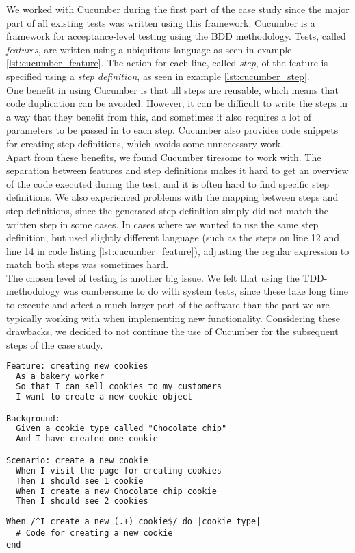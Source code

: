 
We worked with Cucumber during the first part of the case study since
the major part of all existing tests was written using this framework.
Cucumber is a framework for acceptance-level testing using the BDD
methodology. Tests, called \emph{features}, are written using a
ubiquitous language as seen in example \ref{lst:cucumber_feature}. The
action for each line, called \emph{step}, of the feature is specified
using a \emph{step definition}, as seen in example
\ref{lst:cucumber_step}. \cite{web:cucumber}\\

One benefit in using Cucumber is that all steps are reusable, which
means that code duplication can be avoided. However, it can be difficult
to write the steps in a way that they benefit from this, and sometimes
it also requires a lot of parameters to be passed in to each step.
Cucumber also provides code snippets for creating step definitions,
which avoids some unnecessary work.\\

Apart from these benefits, we found Cucumber tiresome to work with. The
separation between features and step definitions makes it hard to get an
overview of the code executed during the test, and it is often hard to
find specific step definitions. We also experienced problems with the
mapping between steps and step definitions, since the generated step
definition simply did not match the written step in some cases. In cases
where we wanted to use the same step definition, but used slightly
different language (such as the steps on line 12 and line 14 in code
listing \ref{lst:cucumber_feature}), adjusting the regular expression to
match both steps was sometimes hard.\\

The chosen level of testing is another big issue. We felt that using the
TDD-methodology was cumbersome to do with system tests, since these take
long time to execute and affect a much larger part of the software than
the part we are typically working with when implementing new
functionality. Considering these drawbacks, we decided to not continue
the use of Cucumber for the subsequent steps of the case study.\\


\begin{lstlisting}[caption=Example of a Cucumber test.,
                   label=lst:cucumber_feature, float=t, language=HTML]
Feature: creating new cookies
  As a bakery worker
  So that I can sell cookies to my customers
  I want to create a new cookie object

Background:
  Given a cookie type called "Chocolate chip"
  And I have created one cookie

Scenario: create a new cookie
  When I visit the page for creating cookies
  Then I should see 1 cookie
  When I create a new Chocolate chip cookie
  Then I should see 2 cookies
\end{lstlisting}


\begin{lstlisting}[caption=Cucumber step definition for the step on row 13 in code listing \ref{lst:cucumber_feature}.,
                   label=lst:cucumber_step, float=t]
When /^I create a new (.+) cookie$/ do |cookie_type|
  # Code for creating a new cookie
end
\end{lstlisting}
